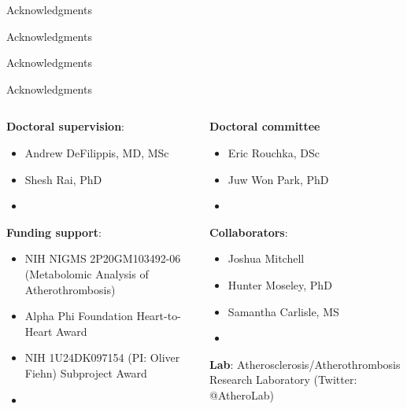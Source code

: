 \documentclass[xcolor=dvipsnames]{beamer}
\begin{document}
\begin{frame}{Acknowledgments}
	\vspace{-5.5pt}
	\begin{center}
	\end{center}
\end{frame}

\begin{frame}{Acknowledgments}
	\vspace{-5.5pt}
	\begin{center}
	\end{center}
\end{frame}

\begin{frame}{Acknowledgments}
	\vspace{-15.5pt}
	\begin{center}
	\end{center}
\end{frame}

\begin{frame}{Acknowledgments}
	\begin{columns}
		\begin{column}{0.5\textwidth}
			\textbf{Doctoral supervision}:
			\begin{itemize}
				\item Andrew DeFilippis, MD, MSc
				\item Shesh Rai, PhD
				\item[]
			\end{itemize}
			\textbf{Funding support}:
			\begin{itemize}
				\item NIH NIGMS 2P20GM103492-06 (Metabolomic Analysis of Atherothrombosis)
				\item Alpha Phi Foundation Heart-to-Heart Award
				\item NIH 1U24DK097154 (PI: Oliver Fiehn) Subproject Award
				\item[]
			\end{itemize}
		\end{column}
		\vspace{-25.5pt}
		\begin{column}{0.5\textwidth}
			\textbf{Doctoral committee }
			\begin{itemize}
				\item Eric Rouchka, DSc
				\item Juw Won Park, PhD
				\item[]
			\end{itemize}
			\textbf{Collaborators}:
			\begin{itemize}
				\item Joshua Mitchell 
				\item Hunter Moseley, PhD
				\item Samantha Carlisle, MS
				\item[]
			\end{itemize}
			\textbf{Lab}: Atherosclerosis/Atherothrombosis Research Laboratory (Twitter: @AtheroLab)
		\end{column}
	\end{columns}
\end{frame}
\end{document}
